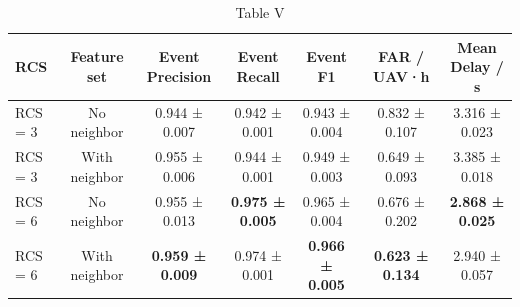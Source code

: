 \begin{table}[htbp]
  \centering
  \caption{Table V}
  \label{tab:table05_rcs_neighbor_sensitivity}
  \begin{tabular}{lcccccc}
    \toprule
    RCS & Feature set & Event Precision & Event Recall & Event F1 & FAR / UAV·h & Mean Delay / s \\
    \midrule
    RCS = 3 & No neighbor & 0.944 ± 0.007 & 0.942 ± 0.001 & 0.943 ± 0.004 & 0.832 ± 0.107 & 3.316 ± 0.023 \\
    RCS = 3 & With neighbor & 0.955 ± 0.006 & 0.944 ± 0.001 & 0.949 ± 0.003 & 0.649 ± 0.093 & 3.385 ± 0.018 \\
    RCS = 6 & No neighbor & 0.955 ± 0.013 & \textbf{0.975 ± 0.005} & 0.965 ± 0.004 & 0.676 ± 0.202 & \textbf{2.868 ± 0.025} \\
    RCS = 6 & With neighbor & \textbf{0.959 ± 0.009} & 0.974 ± 0.001 & \textbf{0.966 ± 0.005} & \textbf{0.623 ± 0.134} & 2.940 ± 0.057 \\
    \bottomrule
  \end{tabular}
\end{table}
